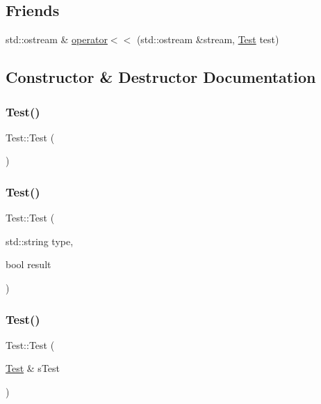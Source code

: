 \subsection*{Friends}
\begin{DoxyCompactItemize}
\item 
std\+::ostream \& \hyperlink{class_test_ad6b01dce65f182b44e1dbb82d80d9dff}{operator$<$$<$} (std\+::ostream \&stream, \hyperlink{class_test}{Test} test)
\end{DoxyCompactItemize}


\subsection{Constructor \& Destructor Documentation}
\hypertarget{class_test_a99f2bbfac6c95612322b0f10e607ebe5}{}\label{class_test_a99f2bbfac6c95612322b0f10e607ebe5} 
\subsubsection{\texorpdfstring{Test()}{Test()}\hspace{0.1cm}{\footnotesize\ttfamily [1/3]}}
{\footnotesize\ttfamily Test\+::\+Test (\begin{DoxyParamCaption}{ }\end{DoxyParamCaption})\hspace{0.3cm}{\ttfamily [inline]}}

\hypertarget{class_test_a4b20375118c81a6a0bddbe98f1de464e}{}\label{class_test_a4b20375118c81a6a0bddbe98f1de464e} 
\subsubsection{\texorpdfstring{Test()}{Test()}\hspace{0.1cm}{\footnotesize\ttfamily [2/3]}}
{\footnotesize\ttfamily Test\+::\+Test (\begin{DoxyParamCaption}\item[{std\+::string}]{type,  }\item[{bool}]{result }\end{DoxyParamCaption})\hspace{0.3cm}{\ttfamily [inline]}}

\hypertarget{class_test_af5be817bd4d65673ab553c7a9d9ddaa8}{}\label{class_test_af5be817bd4d65673ab553c7a9d9ddaa8} 
\subsubsection{\texorpdfstring{Test()}{Test()}\hspace{0.1cm}{\footnotesize\ttfamily [3/3]}}
{\footnotesize\ttfamily Test\+::\+Test (\begin{DoxyParamCaption}\item[{\hyperlink{class_test}{Test} \&}]{s\+Test }\end{DoxyParamCaption})\hspace{0.3cm}{\ttfamily [inline]}}

